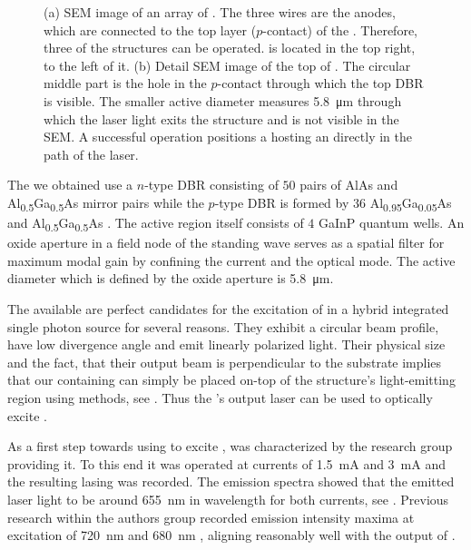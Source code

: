 \begin{figure}[!htb]
\begin{subfigure}[t]{ 0.49\linewidth}
			\caption{}
			\label{subfig::vcsel_sem_detail}
		\end{subfigure}
		\caption[SEM image of an array of \VCSELs]{(a) SEM image of an array of \VCSELs. The three wires are the anodes, which are connected to the top layer ($p$-contact) of the \VCSEL. Therefore, three of the \VCSEL structures can be operated. \BmFour is located in the top right, \BmTwo to the left of it. (b) Detail SEM image of the top of \BmFour. The circular middle part is the hole in the $p$-contact through which the top DBR is visible. The smaller active diameter measures \SI{5.8}{\micro\meter} through which the laser light exits the structure and is not visible in the SEM. A successful \pp operation positions a \nd hosting an \siv directly in the path of the \VCSELs laser.}
	\end{figure}

	The \VCSELs we obtained use a $n$-type DBR consisting of $50$ pairs of AlAs and Al\textsubscript{0.5}Ga\textsubscript{0.5}As mirror pairs while the $p$-type DBR is formed by $36$ Al\textsubscript{0.95}Ga\textsubscript{0.05}As and Al\textsubscript{0.5}Ga\textsubscript{0.5}As \cite{Weidenfeld2012}. The active region itself consists of $4$ GaInP quantum wells. An oxide aperture in a field node of the standing wave serves as a spatial filter for maximum modal gain by confining the current and the optical mode. The active diameter which is defined by the oxide aperture is \SI{5.8}{\micro\meter}.

	The available \VCSELs are perfect candidates for the excitation of \sivs in a hybrid integrated single photon source for several reasons. They exhibit a circular beam profile, have low divergence angle and emit linearly polarized light. Their physical size and the fact, that their output beam is perpendicular to the substrate implies that our \nds containing \nds can simply be placed on-top of the structure's light-emitting region using \pp methods, see . Thus the \VCSEL{}'s output laser can be used to optically excite \sivs.

	As a first step towards using \VCSELs to excite \ccs, \BmFour was characterized by the research group providing it. To this end it was operated at currents of \SI{1.5}{\mA} and \SI{3}{\mA} and the resulting lasing \wl was recorded. The emission spectra showed that the emitted \cw laser light to be around \SI{655}{\nm} in wavelength for both currents, see . Previous research within the authors group recorded \siv emission intensity maxima at excitation \wls of \SI{720}{\nm} and \SI{680}{\nm} \cite{ElensMasterThesis}, aligning reasonably well with the output \wl of \BmFour.

